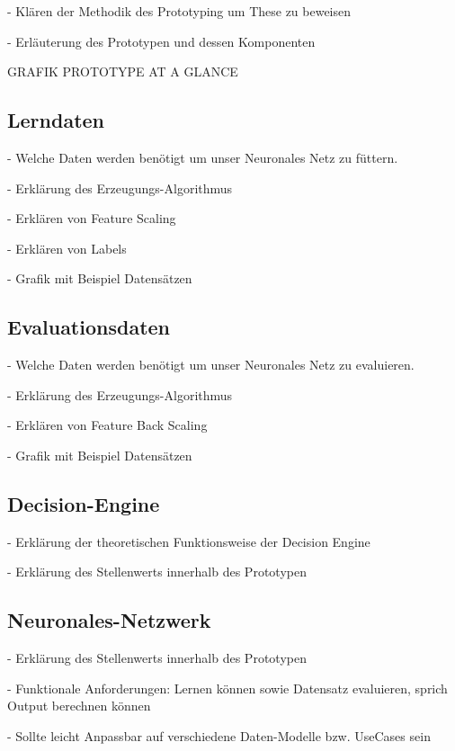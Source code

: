 - Klären der Methodik des Prototyping um These zu beweisen

- Erläuterung des Prototypen und dessen Komponenten 
 
GRAFIK PROTOTYPE AT A GLANCE

\subsection{Lerndaten}
\label{subsec:Lerndaten3}

- Welche Daten werden benötigt um unser Neuronales Netz zu füttern.

- Erklärung des Erzeugungs-Algorithmus 

- Erklären von Feature Scaling

- Erklären von Labels

- Grafik mit Beispiel Datensätzen

\subsection{Evaluationsdaten}
\label{subsec:Evaluationsdaten3}

- Welche Daten werden benötigt um unser Neuronales Netz zu evaluieren.

- Erklärung des Erzeugungs-Algorithmus 

- Erklären von Feature Back Scaling

- Grafik mit Beispiel Datensätzen

\subsection{Decision-Engine}
\label{subsec:Engine3}

- Erklärung der theoretischen Funktionsweise der Decision Engine

- Erklärung des Stellenwerts innerhalb des Prototypen

\subsection{Neuronales-Netzwerk}
- Erklärung des Stellenwerts innerhalb des Prototypen 

- Funktionale Anforderungen: Lernen können sowie Datensatz evaluieren, sprich Output berechnen können

- Sollte leicht Anpassbar auf verschiedene Daten-Modelle bzw. UseCases sein 

